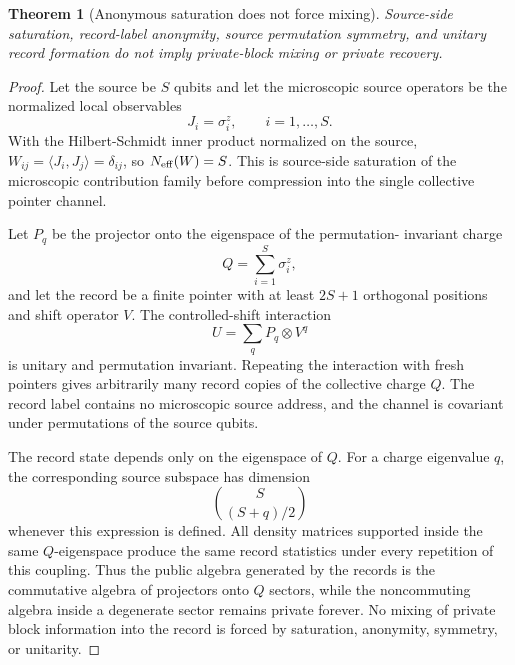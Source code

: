 \documentclass[11pt]{article}
\newtheorem{theorem}{Theorem}
\begin{document}
\begin{theorem}[Anonymous saturation does not force mixing]
\label{thm:anonymous-saturation}
Source-side saturation, record-label anonymity, source permutation
symmetry, and unitary record formation do not imply private-block
mixing or private recovery.
\end{theorem}

\begin{proof}
Let the source be $S$ qubits and let the microscopic source operators be
the normalized local observables
\begin{equation}
  J_i=\sigma_i^z,\qquad i=1,\ldots,S .
\end{equation}
With the Hilbert-Schmidt inner product normalized on the source,
$W_{ij}=\langle J_i,J_j\rangle=\delta_{ij}$, so
$N_{\rm eff}(W)=S$.  This is source-side saturation of the microscopic
contribution family before compression into the single collective
pointer channel.

Let $P_q$ be the projector onto the eigenspace of the permutation-
invariant charge
\begin{equation}
  Q=\sum_{i=1}^S \sigma_i^z ,
\end{equation}
and let the record be a finite pointer with at least $2S+1$ orthogonal
positions and shift operator $V$.  The controlled-shift interaction
\begin{equation}
  U=\sum_q P_q\otimes V^q
\end{equation}
is unitary and permutation invariant.  Repeating the interaction with
fresh pointers gives arbitrarily many record copies of the collective
charge $Q$.  The record label contains no microscopic source address,
and the channel is covariant under permutations of the source qubits.

The record state depends only on the eigenspace of $Q$.  For a charge
eigenvalue $q$, the corresponding source subspace has dimension
\begin{equation}
  \binom{S}{(S+q)/2}
\end{equation}
whenever this expression is defined.  All density matrices supported
inside the same $Q$-eigenspace produce the same record statistics under
every repetition of this coupling.  Thus the public algebra generated by
the records is the commutative algebra of projectors onto $Q$ sectors,
while the noncommuting algebra inside a degenerate sector remains
private forever.  No mixing of private block information into the record
is forced by saturation, anonymity, symmetry, or unitarity.
\end{proof}
\end{document}
